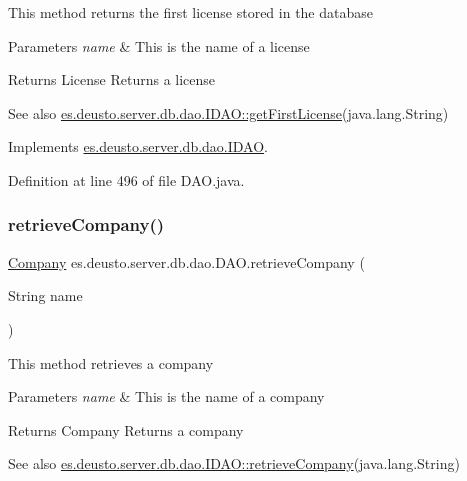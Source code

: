 This method returns the first license stored in the database 
\begin{DoxyParams}{Parameters}
{\em name} & This is the name of a license \\
\hline
\end{DoxyParams}
\begin{DoxyReturn}{Returns}
License Returns a license 
\end{DoxyReturn}
\begin{DoxySeeAlso}{See also}
\hyperlink{interfacees_1_1deusto_1_1server_1_1db_1_1dao_1_1_i_d_a_o_aef2783889a572e23bd57c5a2a955599a}{es.\+deusto.\+server.\+db.\+dao.\+I\+D\+A\+O\+::get\+First\+License}(java.\+lang.\+String) 
\end{DoxySeeAlso}


Implements \hyperlink{interfacees_1_1deusto_1_1server_1_1db_1_1dao_1_1_i_d_a_o_aef2783889a572e23bd57c5a2a955599a}{es.\+deusto.\+server.\+db.\+dao.\+I\+D\+AO}.



Definition at line 496 of file D\+A\+O.\+java.

\mbox{\label{classes_1_1deusto_1_1server_1_1db_1_1dao_1_1_d_a_o_aabd374b169473cfd6e1bdc4efc89b177}} 
\subsubsection{\texorpdfstring{retrieve\+Company()}{retrieveCompany()}}
{\footnotesize\ttfamily \hyperlink{classes_1_1deusto_1_1server_1_1db_1_1data_1_1_company}{Company} es.\+deusto.\+server.\+db.\+dao.\+D\+A\+O.\+retrieve\+Company (\begin{DoxyParamCaption}\item[{String}]{name }\end{DoxyParamCaption})}

This method retrieves a company 
\begin{DoxyParams}{Parameters}
{\em name} & This is the name of a company \\
\hline
\end{DoxyParams}
\begin{DoxyReturn}{Returns}
Company Returns a company 
\end{DoxyReturn}
\begin{DoxySeeAlso}{See also}
\hyperlink{interfacees_1_1deusto_1_1server_1_1db_1_1dao_1_1_i_d_a_o_ad6fd7873e2191e887184e2261e34e3e5}{es.\+deusto.\+server.\+db.\+dao.\+I\+D\+A\+O\+::retrieve\+Company}(java.\+lang.\+String) 
\end{DoxySeeAlso}


